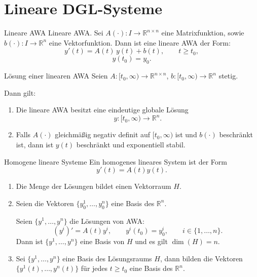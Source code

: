 \newpage
\section{Lineare DGL-Systeme}
\label{5.5}

\begin{definition}{Lineare AWA}
    Lineare AWA. Sei $A(\cdot)\colon I\to\mathbb{R}^{n\times n}$ eine Matrixfunktion, sowie $b(\cdot)\colon I\to\mathbb{R}^n$ eine Vektorfunktion. Dann ist eine lineare AWA der Form:
    $$
    y'(t)=A(t)\,y(t)+b(t),\qquad t\ge t_0,
    $$
    $$
    y(t_0)=y_0.
    $$    
\end{definition}

\begin{satz}{Lösung einer linearen AWA}
    Seien $A:[t_0,\infty)\to\mathbb{R}^{n\times n}$, $b:[t_0,\infty)\to\mathbb{R}^n$ stetig.

    Dann gilt:
    \begin{enumerate}
    \item Die lineare AWA besitzt eine eindeutige globale Lösung
    $$
    y:[t_0,\infty)\to\mathbb{R}^n.
    $$
    \item Falls $A(\cdot)$ gleichmäßig negativ definit auf $[t_0,\infty)$ ist und $b(\cdot)$ beschränkt ist, dann ist $y(t)$ beschränkt und exponentiell stabil.
    \end{enumerate}    
\end{satz}

\begin{satz}{Homogene lineare Systeme}
    Ein homogenes lineares System ist der Form
    $$
    y'(t)=A(t)y(t).
    $$

    \begin{enumerate}
    \item Die Menge der Lösungen bildet einen Vektorraum $H$.
    \item Seien die Vektoren $\{y_0^1,\ldots,y_0^n\}$ eine Basis des $\mathbb{R}^n$.

    Seien $\{y^1,\ldots,y^n\}$ die Lösungen von AWA:
    $$
    (y^i)'=A(t)y^i,\qquad y^i(t_0)=y_0^i,\qquad i\in\{1,\ldots,n\}.
    $$
    Dann ist $\{y^1,\ldots,y^n\}$ eine Basis von $H$ und es gilt $\dim(H)=n$.
    \item Sei $\{y^1,\ldots,y^n\}$ eine Basis des Lösungsraums $H$, dann bilden die Vektoren $\{y^1(t),\ldots,y^n(t)\}$ für jedes $t\ge t_0$ eine Basis des $\mathbb{R}^n$.
    \end{enumerate}    
\end{satz}

